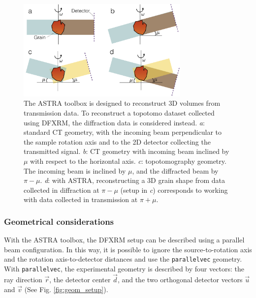 \documentclass[11pt]{scrartcl}
\begin{document}
\begin{figure}[h]
    \centering
    \includegraphics[width=0.75\textwidth]{ASTRA_recon3d_geom.png}
    \caption{The {\footnotesize{ASTRA}} toolbox is designed to reconstruct {\footnotesize{3D}} volumes from transmission data. To reconstruct a topotomo dataset collected using {\footnotesize{DFXRM}}, the diffraction data is considered instead. {\emph{a}}: standard {\footnotesize{CT}} geometry, with the incoming beam perpendicular to the sample rotation axis and to the {\footnotesize{2D}} detector collecting the transmitted signal. {\emph{b}}:  {\footnotesize{CT}} geometry with incoming beam inclined by $\mu$ with respect to the horizontal axis. {\emph{c}}: topotomography geometry. The incoming beam is inclined by $\mu$, and the diffracted beam by $\pi - \mu$. {\emph{d}}: with {\footnotesize{ASTRA}}, reconstructing a {\footnotesize{3D}} grain shape from data collected in diffraction at $\pi-\mu$ (setup in {\emph{c}}) corresponds to working with data collected in transmission at $\pi+\mu$.}
    \label{fig:astra_dfxrm}
\end{figure}

\subsubsection{Geometrical considerations}
\label{sec:astra_geom}

With the {\footnotesize{ASTRA}} toolbox, the {\footnotesize{DFXRM}} setup can be described using a parallel beam configuration. In this way, it is possible to ignore the source-to-rotation axis and the rotation axis-to-detector distances and use the {\texttt{parallel\textunderscore vec}} geometry. With {\texttt{parallel\textunderscore vec}}, the experimental geometry is described by four vectors: the ray direction ${\vec{r}}$, the detector center ${\vec{d}}$, and the two orthogonal detector vectors ${\vec{u}}$ and ${\vec{v}}$ (See Fig. \ref{fig:geom_setup}).
\end{document}
